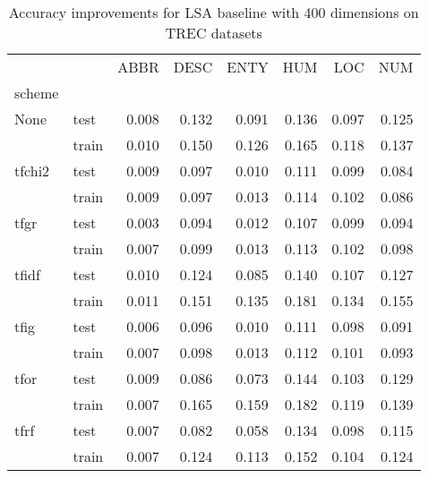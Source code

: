 \begin{table}[H]
\begin{center}

\begin{tabular}{llrrrrrr}
\toprule
{} &  &  ABBR &  DESC &  ENTY &  HUM &  LOC &  NUM \\
scheme &  &       &       &       &      &      &      \\
\midrule
None & test &     0.008 &     0.132 &     0.091 &    0.136 &    0.097 &    0.125 \\
{} & train &     0.010 &     0.150 &     0.126 &    0.165 &    0.118 &    0.137 \\
tfchi2 & test &     0.009 &     0.097 &     0.010 &    0.111 &    0.099 &    0.084 \\
{} & train &     0.009 &     0.097 &     0.013 &    0.114 &    0.102 &    0.086 \\
tfgr & test &     0.003 &     0.094 &     0.012 &    0.107 &    0.099 &    0.094 \\
{} & train &     0.007 &     0.099 &     0.013 &    0.113 &    0.102 &    0.098 \\
tfidf & test &     0.010 &     0.124 &     0.085 &    0.140 &    0.107 &    0.127 \\
{} & train &     0.011 &     0.151 &     0.135 &    0.181 &    0.134 &    0.155 \\
tfig & test &     0.006 &     0.096 &     0.010 &    0.111 &    0.098 &    0.091 \\
{} & train &     0.007 &     0.098 &     0.013 &    0.112 &    0.101 &    0.093 \\
tfor & test &     0.009 &     0.086 &     0.073 &    0.144 &    0.103 &    0.129 \\
{} & train &     0.007 &     0.165 &     0.159 &    0.182 &    0.119 &    0.139 \\
tfrf & test &     0.007 &     0.082 &     0.058 &    0.134 &    0.098 &    0.115 \\
{} & train &     0.007 &     0.124 &     0.113 &    0.152 &    0.104 &    0.124 \\
\bottomrule
\end{tabular}

\caption[Accuracy improvements for LSA baseline with 400 dimensions on TREC datasets]{Accuracy improvements for LSA baseline with 400 dimensions on TREC datasets}
\label{tab:lsa:resuts:400:TREC}
\end{center}
\end{table}





